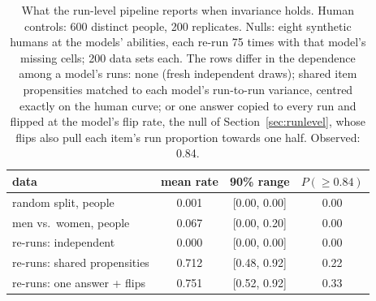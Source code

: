 \begin{table}[t]
\caption{What the run-level pipeline reports when invariance holds. Human controls: 600 distinct people, 200 replicates. Nulls: eight synthetic humans at the models' abilities, each re-run 75 times with that model's missing cells; 200 data sets each. The rows differ in the dependence among a model's runs: none (fresh independent draws); shared item propensities matched to each model's run-to-run variance, centred exactly on the human curve; or one answer copied to every run and flipped at the model's flip rate, the null of Section~\ref{sec:runlevel}, whose flips also pull each item's run proportion towards one half. Observed: 0.84.}
\label{tab:runlevel2}\centering\footnotesize\setlength{\tabcolsep}{4pt}
\begin{tabular}{lccc}\toprule
data & mean rate & 90\% range & $P(\ge0.84)$ \\\midrule
random split, people & 0.001 & [0.00, 0.00] & 0.00 \\
men vs.\ women, people & 0.067 & [0.00, 0.20] & 0.00 \\
re-runs: independent & 0.000 & [0.00, 0.00] & 0.00 \\
re-runs: shared propensities & 0.712 & [0.48, 0.92] & 0.22 \\
re-runs: one answer + flips & 0.751 & [0.52, 0.92] & 0.33 \\
\bottomrule\end{tabular}\end{table}

